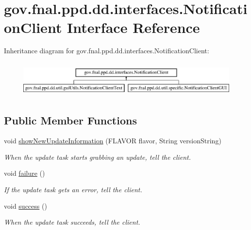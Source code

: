 \hypertarget{interfacegov_1_1fnal_1_1ppd_1_1dd_1_1interfaces_1_1NotificationClient}{\section{gov.\-fnal.\-ppd.\-dd.\-interfaces.\-Notification\-Client Interface Reference}
\label{interfacegov_1_1fnal_1_1ppd_1_1dd_1_1interfaces_1_1NotificationClient}
}
Inheritance diagram for gov.\-fnal.\-ppd.\-dd.\-interfaces.\-Notification\-Client\-:\begin{figure}[H]
\begin{center}
\leavevmode
\includegraphics[height=1.891892cm]{interfacegov_1_1fnal_1_1ppd_1_1dd_1_1interfaces_1_1NotificationClient}
\end{center}
\end{figure}
\subsection*{Public Member Functions}
\begin{DoxyCompactItemize}
\item 
void \hyperlink{interfacegov_1_1fnal_1_1ppd_1_1dd_1_1interfaces_1_1NotificationClient_ab0cf3325fec8142ebfe7babe9a6dcd41}{show\-New\-Update\-Information} (F\-L\-A\-V\-O\-R flavor, String version\-String)
\begin{DoxyCompactList}\small\item\em When the update task starts grabbing an update, tell the client. \end{DoxyCompactList}\item 
void \hyperlink{interfacegov_1_1fnal_1_1ppd_1_1dd_1_1interfaces_1_1NotificationClient_a4f3a03aacbff763583e515a1bcdb4d66}{failure} ()
\begin{DoxyCompactList}\small\item\em If the update task gets an error, tell the client. \end{DoxyCompactList}\item 
void \hyperlink{interfacegov_1_1fnal_1_1ppd_1_1dd_1_1interfaces_1_1NotificationClient_a6aa9aea7f841d3b3af77302d32aa2197}{success} ()
\begin{DoxyCompactList}\small\item\em When the update task succeeds, tell the client. \end{DoxyCompactList}\end{DoxyCompactItemize}


